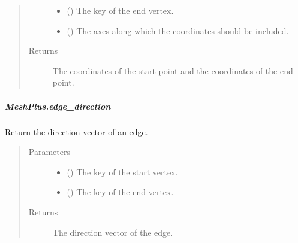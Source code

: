 \documentclass[letterpaper,10pt,english]{sphinxmanual}
\begin{document}
\begin{fulllineitems}
\begin{fulllineitems}
\begin{quote}
\begin{description}
\begin{itemize}
\item {} 
 () \textendash{} The key of the end vertex.

\item {} 
 () \textendash{} The axes along which the coordinates should be included.

\end{itemize}

\item[{Returns}] \leavevmode
{} \textendash{} The coordinates of the start point and the coordinates of the end point.

\end{description}\end{quote}

\end{fulllineitems}



\subparagraph{MeshPlus.edge\_direction}
\label{\detokenize{api/generated/directional_clustering.mesh.MeshPlus.edge_direction:meshplus-edge-direction}}\label{\detokenize{api/generated/directional_clustering.mesh.MeshPlus.edge_direction::doc}}

\begin{fulllineitems}
\label{\detokenize{api/generated/directional_clustering.mesh.MeshPlus.edge_direction:directional_clustering.mesh.MeshPlus.edge_direction}}
Return the direction vector of an edge.
\begin{quote}\begin{description}
\item[{Parameters}] \leavevmode\begin{itemize}
\item {} 
 () \textendash{} The key of the start vertex.

\item {} 
 () \textendash{} The key of the end vertex.

\end{itemize}

\item[{Returns}] \leavevmode
{} \textendash{} The direction vector of the edge.


\end{description}
\end{quote}
\end{fulllineitems}
\end{fulllineitems}
\end{document}
